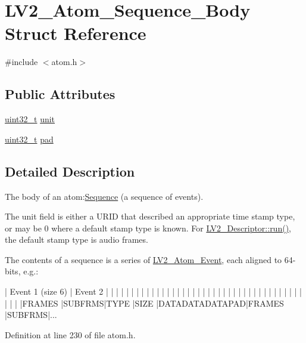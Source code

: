 \hypertarget{struct_l_v2___atom___sequence___body}{}\section{L\+V2\+\_\+\+Atom\+\_\+\+Sequence\+\_\+\+Body Struct Reference}
\label{struct_l_v2___atom___sequence___body}


{\ttfamily \#include $<$atom.\+h$>$}

\subsection*{Public Attributes}
\begin{DoxyCompactItemize}
\item 
\hyperlink{lib-src_2ffmpeg_2win32_2stdint_8h_a6eb1e68cc391dd753bc8ce896dbb8315}{uint32\+\_\+t} \hyperlink{struct_l_v2___atom___sequence___body_a6ab94ba1bf66df8fb777be0fef2136e3}{unit}
\item 
\hyperlink{lib-src_2ffmpeg_2win32_2stdint_8h_a6eb1e68cc391dd753bc8ce896dbb8315}{uint32\+\_\+t} \hyperlink{struct_l_v2___atom___sequence___body_a59edee9bddcb33f78f603f6934d82aa5}{pad}
\end{DoxyCompactItemize}


\subsection{Detailed Description}
The body of an atom\+:\hyperlink{class_sequence}{Sequence} (a sequence of events).

The unit field is either a U\+R\+ID that described an appropriate time stamp type, or may be 0 where a default stamp type is known. For \hyperlink{struct___l_v2___descriptor_ab137135b8024e88d5de9d252534f2b9b}{L\+V2\+\_\+\+Descriptor\+::run()}, the default stamp type is audio frames.

The contents of a sequence is a series of \hyperlink{struct_l_v2___atom___event}{L\+V2\+\_\+\+Atom\+\_\+\+Event}, each aligned to 64-\/bits, e.\+g.\+: 
\begin{DoxyPre}
| Event 1 (size 6)                              | Event 2
|       |       |       |       |       |       |       |       |
| | | | | | | | | | | | | | | | | | | | | | | | | | | | | | | | |
|FRAMES |SUBFRMS|TYPE   |SIZE   |DATADATADATAPAD|FRAMES |SUBFRMS|...
\end{DoxyPre}
 

Definition at line 230 of file atom.\+h.



